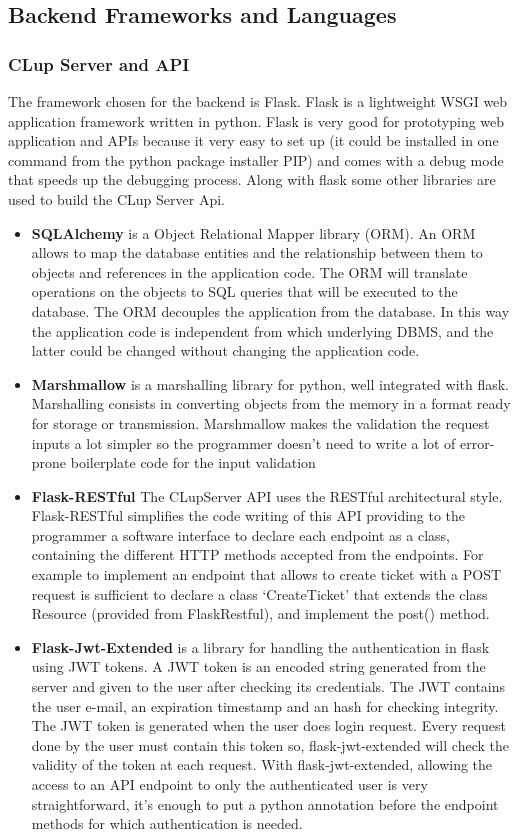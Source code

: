 

\subsection{Backend Frameworks and Languages}

\subsubsection{CLup Server and API}
The framework chosen for the backend is Flask. Flask is a lightweight WSGI web application framework written in python. Flask is very good for prototyping web application and APIs because it very easy to set up (it could be installed in one command from the python package installer PIP) and comes with a debug mode that speeds up the debugging process.
Along with flask some other libraries are used to build the CLup Server Api.
\begin{itemize}
    \item \textbf{SQLAlchemy} is a Object Relational Mapper library (ORM). An ORM allows to map the database entities and the relationship between them to objects and references in the application code. The ORM will translate operations on the objects to SQL queries that will be executed to the database. The ORM decouples the application from the database. In this way the application code is independent from which underlying DBMS, and the latter could be changed without changing the application code.
    \item \textbf{Marshmallow} is a marshalling library for python, well integrated with flask. Marshalling consists in converting objects from the memory in a format ready for storage or transmission. Marshmallow makes the validation the request inputs a lot simpler so the programmer doesn't need to write a lot of error-prone boilerplate code for the input validation
    \item \textbf{Flask-RESTful} The CLupServer API uses the RESTful architectural style. Flask-RESTful simplifies the code writing of this API providing to the programmer a software interface to declare each endpoint as a class, containing the different HTTP methods accepted from the endpoints. For example to implement an endpoint that allows to create ticket with a POST request is sufficient to declare a class `CreateTicket' that extends the class Resource (provided from FlaskRestful), and implement the post() method.
    \item \textbf{Flask-Jwt-Extended} is a library for handling the authentication in flask using JWT tokens. A JWT token is an encoded string generated from the server and given to the user after checking its credentials. The JWT contains the user e-mail, an expiration timestamp and an hash for checking integrity. The JWT token is generated when the user does login request. Every request done by the user must contain this token so, flask-jwt-extended will check the validity of the token at each request. With flask-jwt-extended, allowing the access to an API endpoint to only the authenticated user is very straightforward, it's enough to put a python annotation before the endpoint methods for which authentication is needed.
\end{itemize}
